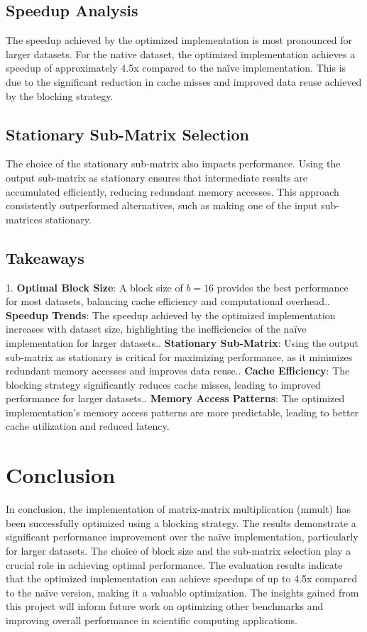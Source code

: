 \documentclass[12pt]{article}
\begin{document}
    \subsection{Speedup Analysis}
    The speedup achieved by the optimized implementation is most pronounced for larger datasets. For the native dataset, the optimized implementation achieves a speedup of approximately 4.5x compared to the naïve implementation. This is due to the significant reduction in cache misses and improved data reuse achieved by the blocking strategy.

    \subsection{Stationary Sub-Matrix Selection}
    The choice of the stationary sub-matrix also impacts performance. Using the output sub-matrix as stationary ensures that intermediate results are accumulated efficiently, reducing redundant memory accesses. This approach consistently outperformed alternatives, such as making one of the input sub-matrices stationary.

    \subsection{Takeaways}
    1. \textbf{Optimal Block Size}: A block size of \( b = 16 \) provides the best performance for most datasets, balancing cache efficiency and computational overhead.. \textbf{Speedup Trends}: The speedup achieved by the optimized implementation increases with dataset size, highlighting the inefficiencies of the naïve implementation for larger datasets.. \textbf{Stationary Sub-Matrix}: Using the output sub-matrix as stationary is critical for maximizing performance, as it minimizes redundant memory accesses and improves data reuse.. \textbf{Cache Efficiency}: The blocking strategy significantly reduces cache misses, leading to improved performance for larger datasets.. \textbf{Memory Access Patterns}: The optimized implementation's memory access patterns are more predictable, leading to better cache utilization and reduced latency.




\section{Conclusion}
In conclusion, the implementation of matrix-matrix multiplication (mmult) has been successfully optimized using a blocking strategy. The results demonstrate a significant performance improvement over the naïve implementation, particularly for larger datasets. The choice of block size and the sub-matrix selection play a crucial role in achieving optimal performance.
The evaluation results indicate that the optimized implementation can achieve speedups of up to 4.5x compared to the naïve version, making it a valuable optimization. The insights gained from this project will inform future work on optimizing other benchmarks and improving overall performance in scientific computing applications.
\newpage
\end{document}
